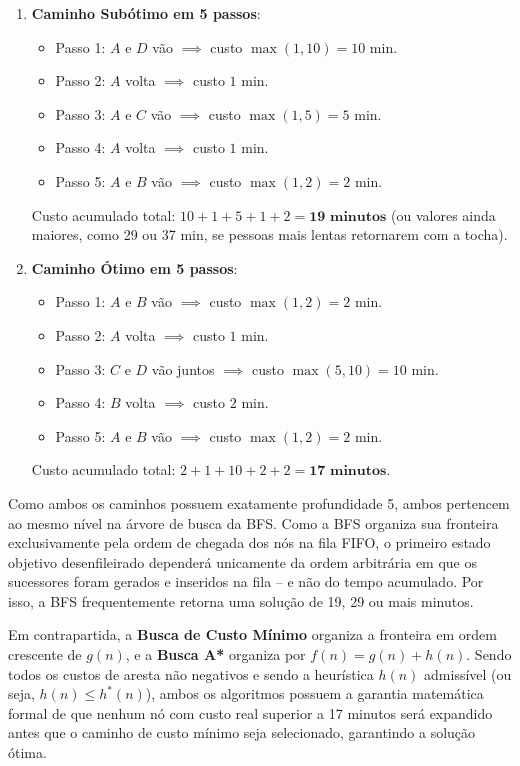 \begin{enumerate}
	\item \textbf{Caminho Subótimo em 5 passos}:
	      \begin{itemize}
		      \item Passo 1: $A$ e $D$ vão $\implies$ custo $\max(1, 10) = 10\text{ min}$.
		      \item Passo 2: $A$ volta $\implies$ custo $1\text{ min}$.
		      \item Passo 3: $A$ e $C$ vão $\implies$ custo $\max(1, 5) = 5\text{ min}$.
		      \item Passo 4: $A$ volta $\implies$ custo $1\text{ min}$.
		      \item Passo 5: $A$ e $B$ vão $\implies$ custo $\max(1, 2) = 2\text{ min}$.
	      \end{itemize}
	      Custo acumulado total: $10 + 1 + 5 + 1 + 2 = \mathbf{19\text{ minutos}}$ (ou valores ainda maiores, como 29 ou 37 min, se pessoas mais lentas retornarem com a tocha).

	\item \textbf{Caminho Ótimo em 5 passos}:
	      \begin{itemize}
		      \item Passo 1: $A$ e $B$ vão $\implies$ custo $\max(1, 2) = 2\text{ min}$.
		      \item Passo 2: $A$ volta $\implies$ custo $1\text{ min}$.
		      \item Passo 3: $C$ e $D$ vão juntos $\implies$ custo $\max(5, 10) = 10\text{ min}$.
		      \item Passo 4: $B$ volta $\implies$ custo $2\text{ min}$.
		      \item Passo 5: $A$ e $B$ vão $\implies$ custo $\max(1, 2) = 2\text{ min}$.
	      \end{itemize}
	      Custo acumulado total: $2 + 1 + 10 + 2 + 2 = \mathbf{17\text{ minutos}}$.
\end{enumerate}

Como ambos os caminhos possuem exatamente profundidade 5, ambos pertencem ao mesmo nível na árvore de busca da BFS. Como a BFS organiza sua fronteira exclusivamente pela ordem de chegada dos nós na fila FIFO, o primeiro estado objetivo desenfileirado dependerá unicamente da ordem arbitrária em que os sucessores foram gerados e inseridos na fila -- e não do tempo acumulado. Por isso, a BFS frequentemente retorna uma solução de 19, 29 ou mais minutos.

Em contrapartida, a \textbf{Busca de Custo Mínimo} organiza a fronteira em ordem crescente de $g(n)$, e a \textbf{Busca A*} organiza por $f(n) = g(n) + h(n)$. Sendo todos os custos de aresta não negativos e sendo a heurística $h(n)$ admissível (ou seja, $h(n) \leq h^*(n)$), ambos os algoritmos possuem a garantia matemática formal de que nenhum nó com custo real superior a 17 minutos será expandido antes que o caminho de custo mínimo seja selecionado, garantindo a solução ótima.
